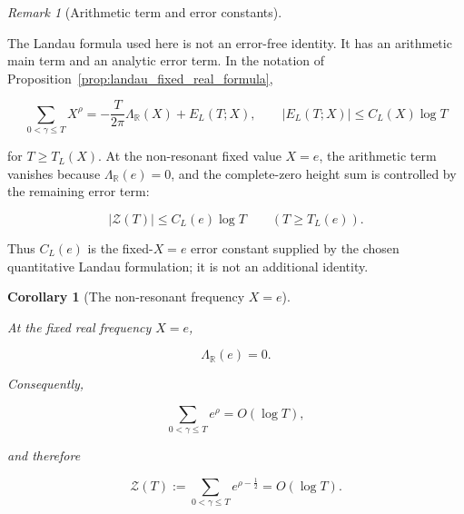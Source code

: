\documentclass[11pt]{amsart}
\numberwithin{equation}{section}
\theoremstyle{plain}
\newtheorem{corollary}[theorem]{Corollary}
\theoremstyle{definition}
\theoremstyle{remark}
\newtheorem{remark}[theorem]{Remark}
\begin{document}
\begin{remark}[Arithmetic term and error constants]
\label{rem:landau_arithmetic_term_error_constants}

The Landau formula used here is not an error-free identity. It has an
arithmetic main term and an analytic error term. In the notation of
Proposition~\ref{prop:landau_fixed_real_formula},

\begin{equation}
\sum_{0<\gamma\le T}X^\rho
=
-
\frac{T}{2\pi}\Lambda_{\mathbb R}(X)
+
E_L(T;X),
\qquad
|E_L(T;X)|\le C_L(X)\log T
\end{equation}

for \(T\ge T_L(X)\). At the non-resonant fixed value \(X=e\), the
arithmetic term vanishes because \(\Lambda_{\mathbb R}(e)=0\), and the
complete-zero height sum is controlled by the remaining error term:

\begin{equation}
|\mathcal Z(T)|
\le
C_L(e)\log T
\qquad (T\ge T_L(e)).
\end{equation}

Thus \(C_L(e)\) is the fixed-\(X=e\) error constant supplied by the
chosen quantitative Landau formulation; it is not an additional
identity.

\end{remark}

\begin{corollary}[The non-resonant frequency \(X=e\)]
\label{cor:landau_nonresonant_frequency_e}

At the fixed real frequency \(X=e\),

\begin{equation}
\Lambda_{\mathbb R}(e)=0.
\label{eq:lambda_real_e_zero}
\end{equation}

Consequently,

\begin{equation}
\sum_{0<\gamma\le T}
e^{\rho}
=
O(\log T),
\label{eq:sum_e_rho_log_bound}
\end{equation}

and therefore

\begin{equation}
\mathcal Z(T)
:=
\sum_{0<\gamma\le T}
e^{\rho-\frac12}
=
O(\log T).
\label{eq:complete_zero_height_walk_log_bound}
\end{equation}

\end{corollary}
\end{document}
